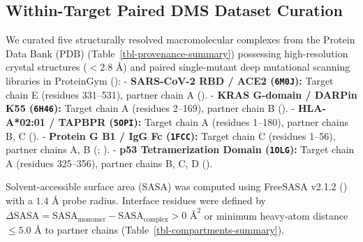 \documentclass[
  11pt,
  us-letterpaper,
  DIV=11,
  numbers=noendperiod]{scrartcl}
\begin{document}
\subsection{Within-Target Paired DMS Dataset
Curation}\label{sec-methods-curation}

We curated five structurally resolved macromolecular complexes from the
Protein Data Bank (PDB) (Table~\ref{tbl-provenance-summary}) possessing
high-resolution crystal structures (\(<2.8\text{ \AA}\)) and paired
single-mutant deep mutational scanning libraries in ProteinGym
(): -
\textbf{SARS-CoV-2 RBD / ACE2 (\texttt{6M0J}):} Target chain E (residues
331--531), partner chain A (). - \textbf{KRAS G-domain / DARPin K55 (\texttt{6H46}):} Target
chain A (residues 2--169), partner chain B
(). - \textbf{HLA-A*02:01 /
TAPBPR (\texttt{5OPI}):} Target chain A (residues 1--180), partner
chains B, C (). -
\textbf{Protein G B1 / IgG Fc (\texttt{1FCC}):} Target chain C (residues
1--56), partner chains A, B (; ). -
\textbf{p53 Tetramerization Domain (\texttt{1OLG}):} Target chain A
(residues 325--356), partner chains B, C, D
().

Solvent-accessible surface area (SASA) was computed using FreeSASA
v2.1.2 () with a
\(1.4\text{ \AA}\) probe radius. Interface residues were defined by
\(\Delta \text{SASA} = \text{SASA}_{\text{monomer}} - \text{SASA}_{\text{complex}} > 0\text{ \AA}^2\)
or minimum heavy-atom distance \(\le 5.0\text{ \AA}\) to partner chains
(Table~\ref{tbl-compartments-summary}).
\end{document}
